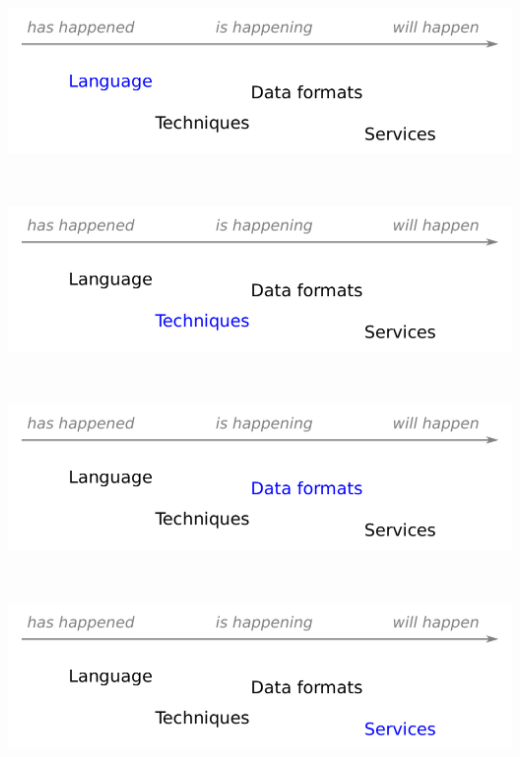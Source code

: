 \documentclass[aspectratio=169]{beamer}
\begin{document}
\begin{frame}{\mbox{ }}
\vspace{0.5 cm}

\begin{center}
\includegraphics[width=0.9\linewidth]{img/topics-1.pdf}
\end{center}
\end{frame}

\begin{frame}{\mbox{ }}
\vspace{0.5 cm}

\begin{center}
\includegraphics[width=0.9\linewidth]{img/topics-2.pdf}
\end{center}
\end{frame}

\begin{frame}{\mbox{ }}
\vspace{0.5 cm}

\begin{center}
\includegraphics[width=0.9\linewidth]{img/topics-3.pdf}
\end{center}
\end{frame}

\begin{frame}{\mbox{ }}
\vspace{0.5 cm}

\begin{center}
\includegraphics[width=0.9\linewidth]{img/topics-4.pdf}
\end{center}
\end{frame}
\end{document}
